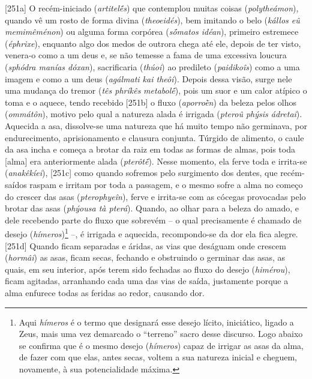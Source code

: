 {[}251a{]} O recém-iniciado (\emph{artitelḗs}) que contemplou muitas
coisas (\emph{polytheámon}), quando vê um rosto de forma divina
(\emph{theoeidés}), bem imitando o belo (\emph{kállos eû memimêménon})
ou alguma forma corpórea (\emph{sṓmatos idéan}), primeiro estremece
(\emph{éphrixe}), enquanto algo dos medos de outrora chega até ele,
depois de ter visto, venera-o como a um deus e, se não temesse a fama de
uma excessiva loucura (\emph{sphódra manías dóxan}), sacrificaria
(\emph{thúoi}) ao predileto (\emph{paidikoîs}) como a uma imagem e como
a um deus (\emph{agálmati kai theôi}). Depois dessa visão, surge nele
uma mudança do tremor (\emph{tês phríkês} \emph{metabolḗ}), pois um suor
e um calor atípico o toma e o aquece, tendo recebido {[}251b{]} o fluxo
(\emph{aporroḕn}) da beleza pelos olhos (\emph{ommátôn}), motivo pelo
qual a natureza alada é irrigada (\emph{pteroû phýsis ádretai}).
Aquecida a asa, dissolve-se uma natureza que há muito tempo não
germinava, por endurecimento, aprisionamento e clausura conjunta.
Túrgido de alimento, o caule da asa incha e começa a brotar da raiz em
todas as formas de almas, pois toda {[}alma{]} era anteriormente alada
(\emph{pterôtḗ}). Nesse momento, ela ferve toda e irrita-se
(\emph{anakêkíei}), {[}251c{]} como quando sofremos pelo surgimento dos
dentes, que recém-saídos raspam e irritam por toda a passagem, e o mesmo
sofre a alma no começo do crescer das asas (\emph{pterophyeîn}), ferve e
irrita-se com as cócegas provocadas pelo brotar das asas (\emph{phýousa
tà pterá}). Quando, ao olhar para a beleza do amado, e dele recebendo
parte do fluxo que sobrevém -- o qual precisamente é chamado de desejo
(\emph{hímeros})\footnote{Aqui \emph{hímeros} é o termo que designará
  esse desejo lícito, iniciático, ligado a Zeus, mais uma vez demarcado
  o ``terreno'' sacro desse discurso. Logo abaixo se confirma que é o
  mesmo desejo (\emph{hímeros}) capaz de irrigar as asas da alma, de
  fazer com que elas, antes secas, voltem a sua natureza inicial e
  cheguem, novamente, à sua potencialidade máxima.} --, é irrigada e
aquecida, recompondo-se da dor ela fica alegre. {[}251d{]} Quando ficam
separadas e áridas, as vias que deságuam onde crescem (\emph{hormâi}) as
asas, ficam secas, fechando e obstruindo o germinar das asas, as quais,
em seu interior, após terem sido fechadas ao fluxo do desejo
(\emph{himérou}), ficam agitadas, arranhando cada uma das vias de saída,
justamente porque a alma enfurece todas as feridas ao redor, causando
dor.

